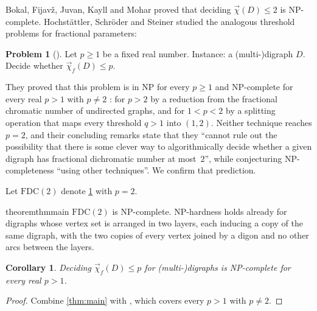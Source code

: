 \documentclass[11pt,a4paper]{article}
\theoremstyle{plain}
\newtheorem{corollary}[theorem]{Corollary}
\theoremstyle{definition}
\newtheorem{problem}[theorem]{Problem}
\theoremstyle{remark}
\newcommand{\fdc}{\vec{\chi}_{f}}
\newcommand{\dic}{\vec{\chi}}
\newcommand{\FDC}{\mathrm{FDC}}
\begin{document}
Bokal, Fijavž, Juvan, Kayll and Mohar \cite{BFJKM04} proved that deciding $\dic(D)\le2$ is NP-complete. Hochstättler, Schröder and Steiner studied the analogous threshold problems for fractional parameters:

\begin{problem}[{\cite[Problem~3.21]{HSS20}}]\label{prob:321}
Let $p\ge1$ be a fixed real number. Instance: a (multi-)digraph $D$. Decide whether $\fdc(D)\le p$.
\end{problem}

They proved that this problem is in NP for every $p\ge1$ \cite[Observation~3.15]{HSS20} and NP-complete for every real $p>1$ with $p\ne2$ \cite[Theorem~3.20]{HSS20}: for $p>2$ by a reduction from the fractional chromatic number of undirected graphs, and for $1<p<2$ by a splitting operation that maps every threshold $q>1$ into $(1,2)$. Neither technique reaches $p=2$, and their concluding remarks state that they ``cannot rule out the possibility that there is some clever way to algorithmically decide whether a given digraph has fractional dichromatic number at most~$2$'', while conjecturing NP-completeness ``using other techniques''. We confirm that prediction.

Let $\FDC(2)$ denote \cref{prob:321} with $p=2$.

\begin{restatable}{theorem}{thmmain}\label{thm:main}
$\FDC(2)$ is NP-complete. NP-hardness holds already for digraphs whose vertex set is arranged in two layers, each inducing a copy of the same digraph, with the two copies of every vertex joined by a digon and no other arcs between the layers.
\end{restatable}

\begin{corollary}\label{cor:all-p}
Deciding $\fdc(D)\le p$ for (multi-)digraphs is NP-complete for every real $p>1$.
\end{corollary}
\begin{proof}
Combine \cref{thm:main} with \cite[Theorem~3.20]{HSS20}, which covers every $p>1$ with $p\ne2$.
\end{proof}
\end{document}
